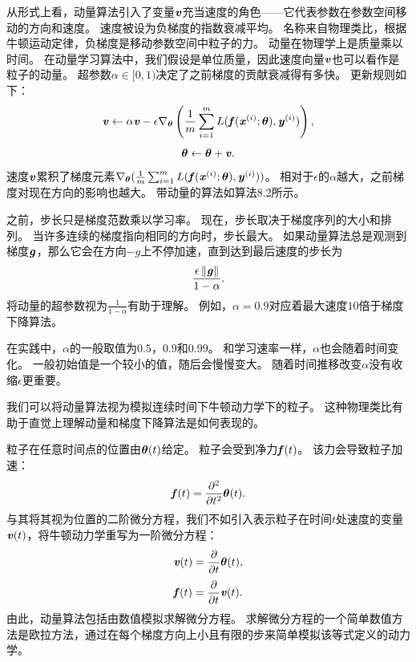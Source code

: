 从形式上看，动量算法引入了变量$\boldsymbol{\mathit{v}}$充当速度的角色——它代表参数在参数空间移动的方向和速度。
速度被设为负梯度的指数衰减平均。
名称来自物理类比，根据牛顿运动定律，负梯度是移动参数空间中粒子的力。
动量在物理学上是质量乘以时间。
在动量学习算法中，我们假设是单位质量，因此速度向量$\boldsymbol{\mathit{v}}$也可以看作是粒子的动量。
超参数$\alpha\in[0,1)$决定了之前梯度的贡献衰减得有多快。
更新规则如下：
\begin{equation}
\boldsymbol{\mathit{v}} \leftarrow \alpha \boldsymbol{\mathit{v}} - \epsilon \nabla_{\boldsymbol{\theta}} \left( \frac{1}{m} \sum_{i=1}^m  L(\boldsymbol{\mathit{f}}(\boldsymbol{\mathit{x}}^{(i)}; \boldsymbol{\theta}), \boldsymbol{\mathit{y}}^{(i)}   )  \right),
\end{equation}
\begin{equation}
\boldsymbol{\theta} \leftarrow \boldsymbol{\theta}  + \boldsymbol{\mathit{v}} .
\end{equation}
速度$\boldsymbol{\mathit{v}}$累积了梯度元素$\nabla_{\boldsymbol{\theta}}( \frac{1}{m} \sum_{i=1}^m L( \boldsymbol{\mathit{f}}(\boldsymbol{\mathit{x}}^{(i)}; \boldsymbol{\theta}), \boldsymbol{\mathit{y}}^{(i)} )  )$。
相对于$\epsilon$的$\alpha$越大，之前梯度对现在方向的影响也越大。
带动量的算法如算法8.2所示。


之前，步长只是梯度范数乘以学习率。
现在，步长取决于梯度序列的大小和排列。
当许多连续的梯度指向相同的方向时，步长最大。
如果动量算法总是观测到梯度$\boldsymbol{\mathit{g}}$，那么它会在方向$-g$上不停加速，直到达到最后速度的步长为
\begin{equation}
    \frac{\epsilon \left\lVert\boldsymbol{\mathit{g}}\right\rVert}{1-\alpha} .
\end{equation}
将动量的超参数视为$\frac{1}{1-\alpha}$有助于理解。
例如，$\alpha=0.9$对应着最大速度$10$倍于梯度下降算法。


在实践中，$\alpha$的一般取值为$0.5$，$0.9$和$0.99$。
和学习速率一样，$\alpha$也会随着时间变化。 
一般初始值是一个较小的值，随后会慢慢变大。
随着时间推移改变$\alpha$没有收缩$\epsilon$更重要。

我们可以将动量算法视为模拟连续时间下牛顿动力学下的粒子。
这种物理类比有助于直觉上理解动量和梯度下降算法是如何表现的。

粒子在任意时间点的位置由$\boldsymbol{\theta}(t)$给定。
粒子会受到净力$\boldsymbol{\mathit{f}}(t)$。
该力会导致粒子加速：
\begin{equation}
    \boldsymbol{\mathit{f}}(t) = \frac{\partial^2}{\partial t^2} \boldsymbol{\theta}(t) .
\end{equation}
与其将其视为位置的二阶微分方程，我们不如引入表示粒子在时间$t$处速度的变量$\boldsymbol{\mathit{v}}(t)$，将牛顿动力学重写为一阶微分方程：
\begin{equation}
    \boldsymbol{\mathit{v}}(t) = \frac{\partial}{\partial t} \boldsymbol{\theta}(t) ,
\end{equation}
\begin{equation}
    \boldsymbol{\mathit{f}}(t) = \frac{\partial}{\partial t} \boldsymbol{\mathit{v}}(t) .
\end{equation}
由此，动量算法包括由数值模拟求解微分方程。
求解微分方程的一个简单数值方法是欧拉方法，通过在每个梯度方向上小且有限的步来简单模拟该等式定义的动力学。

